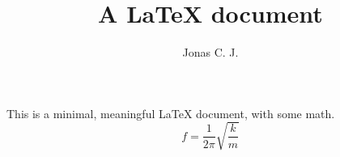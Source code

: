 \documentclass[a4paper, 12pt]{article}
\title{A \LaTeX{} document}
\author{Jonas C. J.}
\begin{document}
\maketitle

This is a minimal, meaningful \LaTeX{} document, with some math.
\begin{equation}
	f = \frac{1}{2\pi}
	    \sqrt{\frac{k}{m}}
\end{equation}
\end{document}
